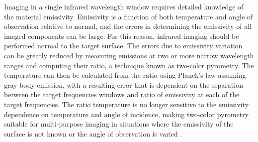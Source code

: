 \documentclass{jpp}
\begin{document}
Imaging in a single infrared wavelength window requires detailed knowledge of the material emissivity. Emissivity is a function of both temperature and angle of observation relative to normal, and the errors in determining the emissivity of all imaged components can be large. For this reason, infrared imaging should be performed normal to the target surface. The errors due to emissivity variation can be greatly reduced by measuring emissions at two or more narrow wavelength ranges and computing their ratio, a technique known as two-color pyrometry. The temperature can then be calculated from the ratio using Planck's law assuming gray body emission, with a resulting error that is dependent on the separation between the target frequencies windows and ratio of emissivity at each of the target frequencies. The ratio temperature is no longer sensitive to the emissivity dependence on temperature and angle of incidence, making two-color pyrometry suitable for multi-purpose imaging in situations where the emissivity of the surface is not known or the angle of observation is varied \citep{MullerB2001Doaf}.



 
\end{document}

